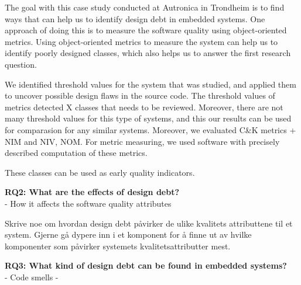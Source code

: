 The goal with this case study conducted at Autronica in Trondheim is to find ways that can help us to identify design debt in embedded systems. One approach of doing this is to measure the software quality using object-oriented metrics. Using object-oriented metrics to measure the system can help us to identify poorly designed classes, which also helps us to answer the first research question.

We identified threshold values for the system that was studied, and applied them to uncover possible design flaws in the source code. The threshold values of metrics detected X classes that needs to be reviewed. Moreover, there are not many threshold values for this type of systems, and this our results can be used for comparasion for any similar systems. Moreover, we evaluated C\&K metrics + NIM and NIV, NOM. For metric measuring, we used software with precisely described computation of these metrics.


These classes can be used as early quality indicators.

\textbf{RQ2: What are the effects of design debt?} \\
- How it affects the software quality attributes

Skrive noe om hvordan design debt påvirker de ulike kvalitets attributtene til et system. Gjerne gå dypere inn i et komponent for å finne ut av hvilke komponenter som påvirker systemets kvalitetsattributter mest. 

\textbf{RQ3: What kind of design debt can be found in embedded systems?} \\
- Code smells
- 

